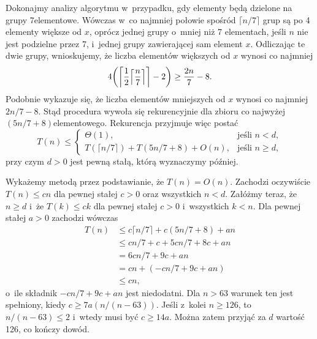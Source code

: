 
\exercise %
Dokonajmy analizy algorytmu  w~przypadku, gdy elementy będą dzielone na grupy 7\nbhyphen elementowe.
Wówczas w~co najmniej połowie spośród $\lceil n/7\rceil$ grup są po 4 elementy większe od $x$, oprócz jednej grupy o~mniej niż 7 elementach, jeśli $n$ nie jest podzielne przez 7, i~jednej grupy zawierającej sam element $x$.
Odliczając te dwie grupy, wnioskujemy, że liczba elementów większych od $x$ wynosi co najmniej
\[
	4\biggl(\biggl\lceil\frac{1}{2}\Bigl\lceil\frac{n}{7}\Bigr\rceil\biggr\rceil-2\biggr) \ge \frac{2n}{7}-8.
\]
Podobnie wykazuje się, że liczba elementów mniejszych od $x$ wynosi co najmniej $2n/7-8$.
Stąd procedura wywoła się rekurencyjnie dla zbioru co najwyżej $(5n/7+8)$\nbhyphen elementowego.
Rekurencja przyjmuje więc postać
\[
	T(n) \le \begin{cases}
		\Theta(1), & \text{jeśli $n<d$}, \\
		T(\lceil n/7\rceil)+T(5n/7+8)+O(n), & \text{jeśli $n\ge d$},
	\end{cases}
\]
przy czym $d>0$ jest pewną stałą, którą wyznaczymy później.

Wykażemy metodą przez podstawianie, że $T(n)=O(n)$.
Zachodzi oczywiście $T(n)\le cn$ dla pewnej stałej $c>0$ oraz wszystkich $n<d$.
Załóżmy teraz, że $n\ge d$ i~że $T(k)\le ck$ dla pewnej stałej $c>0$ i~wszystkich $k<n$.
Dla pewnej stałej $a>0$ zachodzi wówczas
\begin{align*}
	T(n) &\le c\lceil n/7\rceil+c(5n/7+8)+an \\
	&\le cn/7+c+5cn/7+8c+an \\
	&= 6cn/7+9c+an \\
	&= cn+(-cn/7+9c+an) \\
	&\le cn,
\end{align*}
o~ile składnik $-cn/7+9c+an$ jest niedodatni.
Dla $n>63$ warunek ten jest spełniony, kiedy $c\ge7a(n/(n-63))$.
Jeśli z~kolei $n\ge126$, to $n/(n-63)\le2$ i~wtedy musi być $c\ge14a$.
Można zatem przyjąć za $d$ wartość 126, co kończy dowód.

